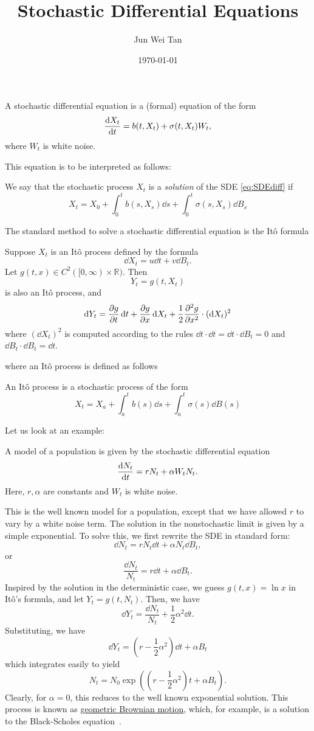 \documentclass[prb,12pt]{revtex4-2}
\theoremstyle{definition}
\theoremstyle{definition}
\theoremstyle{definition}
\newcommand{\R}{\mathbb{R}}
\begin{document}
	\title{Stochastic Differential Equations}
	\author{Jun Wei Tan}
	\date{\today}
	\maketitle

\begin{Definition}
	A stochastic differential equation is a (formal) equation of the form
	\begin{equation}\label{eq:SDEdiff}
	\dv{X_t}{t}=b(t, X_t)+\sigma(t, X_t)W_t,
\end{equation}
	where $W_t$ is white noise. 
\end{Definition}
This equation is to be interpreted as follows:
\begin{Definition}
	We say that the stochastic process $X_t$ is a \emph{solution} of the SDE \eqref{eq:SDEdiff} if
	\[X_t = X_0+\int_0^t b(s, X_s)\dd{s}+ \int_0^t \sigma(s, X_s)\dd{B_s}\]
\end{Definition}
The standard method to solve a stochastic differential equation is the Itô formula
\begin{Theorem}
	Suppose $X_t$ is an Itô process defined by the formula
	\[\dd{X_t}=u\dd{t}+v\dd{B_t}.\]
	Let $g(t,x)\in C^2([0,\infty)\times \R)$. Then
	\[Y_t=g(t, X_t)\]
	is also an Itô process, and
	\[\dd{Y_t}=\pdv{g}{t}(t, X_t)\dd{t}+\pdv{g}{x}(t, X_t)\dd{X_t}+\frac 12 \pdv[2]{g}{x}(t, X_t)\cdot (\dd{X_t})^2\]
	where $(\dd{X_t})^2$ is computed according to the rules $\dd{t}\cdot \dd{t} = \dd{t}\cdot \dd{B_t}=0$ and $\dd{B_t}\cdot \dd{B_t}=\dd{t}$.
\end{Theorem}
where an Itô process is defined as follows
\begin{Definition}
	An Itô process is a stochastic process of the form
	\[X_t = X_a +\int_a^t b(s)\dd{s} + \int_a^t \sigma(s)\dd{B(s)}\]
\end{Definition}
Let us look at an example:
\begin{Example}
	A model of a population is given by the stochastic differential equation
	\[\dv{N_t}{t} = r N_t + \alpha W_t N_t.\]
	Here, $r,\alpha$ are constants and $W_t$ is white noise.
\end{Example}
This is the well known model for a population, except that we have allowed $r$ to vary by a white noise term. The solution in the nonstochastic limit is given by a simple exponential. To solve this, we first rewrite the SDE in standard form:
\[\dd{N_t}=r N_t\dd{t}+\alpha N_t \dd{B_t},\]
or
\[\frac{\dd{N_t}}{N_t} = r \dd{t} + \alpha \dd{B_t}.\]
Inspired by the solution in the deterministic case, we guess $g(t, x)=\ln x$ in Itô's formula, and let $Y_t=g(t, N_t)$. Then, we have
\[\dd{Y_t}=\frac{\dd{N_t}}{N_t}+\frac 12 \alpha^2 \dd{t}.\]
Substituting, we have
\[\dd{Y_t} = \left(r- \frac 12\alpha^2 \right)\dd{t} +\alpha B_t\]
which integrates easily to yield
\[N_t = N_0 \exp\left(\left(r - \frac 12 \alpha^2\right)t+\alpha B_t\right).\]
Clearly, for $\alpha=0$, this reduces to the well known exponential solution. This process is known as \uline{geometric Brownian motion}, which, for example, is a solution to the Black-Scholes equation~\cite{inbook}.
\end{document}
